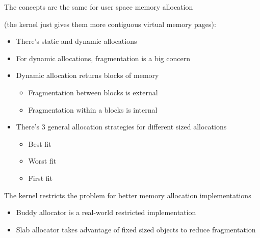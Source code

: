   \begin{slide}


    The concepts are the same for user space memory allocation

    (the kernel just gives them more contiguous virtual memory pages):

    \begin{itemize}
      \item There's static and dynamic allocations
      \item For dynamic allocations, fragmentation is a big concern
      \item Dynamic allocation returns blocks of memory
        \begin{itemize}
          \item Fragmentation between blocks is external
          \item Fragmentation within a blocks is internal
        \end{itemize}
      \item There's 3 general allocation strategies for different sized
            allocations
        \begin{itemize}
          \item Best fit
          \item Worst fit
          \item First fit
        \end{itemize}
    \end{itemize}

  \end{slide}

  \begin{slide}

  
    The kernel restricts the problem for better memory allocation
    implementations
  
    \begin{itemize}
      \item Buddy allocator is a real-world restricted implementation
      \item Slab allocator takes advantage of fixed sized objects to reduce
            fragmentation
    \end{itemize}
  
  \end{slide}

